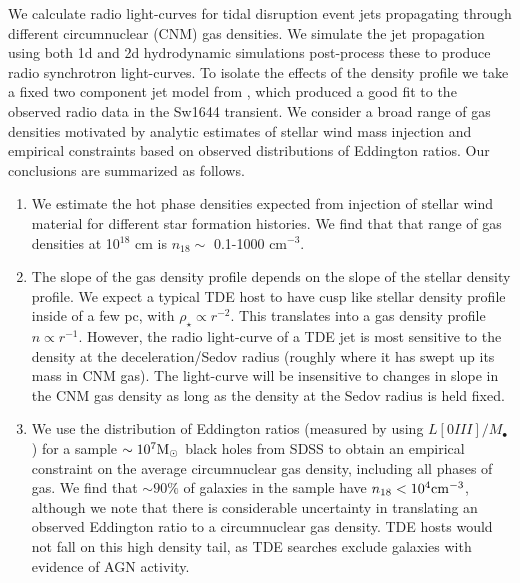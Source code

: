 \documentclass[usenatbib,fleqn]{mnras}
\newcommand{\Mbh}[1][]{M_{\bullet#1}}
\newcommand{\Msun}{{\rm M_\odot}}
\begin{document}
We calculate radio light-curves for tidal disruption event jets
propagating through different circumnuclear (CNM) gas densities. We
simulate the jet propagation using both 1d and 2d hydrodynamic
simulations post-process these to produce radio synchrotron
light-curves. To isolate the effects of the density profile we take a
fixed two component jet model from \citet{Mimica+2015}, which produced
a good fit to the observed radio data in the Sw1644 transient. We
consider a broad range of gas densities motivated by analytic
estimates of stellar wind mass injection and empirical constraints
based on observed distributions of Eddington ratios. Our conclusions
are summarized as follows.

\begin{enumerate}
\item We estimate the hot phase densities expected from injection of
  stellar wind material for different star formation histories. We
  find that that range of gas densities at 10$^{18}$ cm is $n_{18}
  \sim$ 0.1-1000 cm$^{-3}$.

\item The slope of the gas density profile depends on the slope of the
  stellar density profile. We expect a typical TDE host to have cusp
  like stellar density profile inside of a few pc, with $\rho_\star
  \propto r^{-2}$. This translates into a gas density profile $n
  \propto r^{-1}$. However, the radio light-curve of a TDE jet is most
  sensitive to the density at the deceleration/Sedov radius (roughly
  where it has swept up its mass in CNM gas). The light-curve will be
  insensitive to changes in slope in the CNM gas density as long as
  the density at the Sedov radius is held fixed.

\item We use the distribution of Eddington ratios (measured by
  \citealt{Kauffmann+2009} using $L[0III]/\Mbh$) for a sample $\sim
  10^{7} \Msun$ black holes from SDSS to obtain an empirical
  constraint on the average circumnuclear gas density, including all
  phases of gas. We find that $\sim90\%$ of galaxies in the sample
  have $n_{18}<10^{4} {\rm cm}^{-3}$, although we note that there is
  considerable uncertainty in translating an observed Eddington ratio
  to a circumnuclear gas density. TDE hosts would not fall on this
  high density tail, as TDE searches exclude galaxies with evidence of
  AGN activity.


\end{enumerate}
\end{document}
